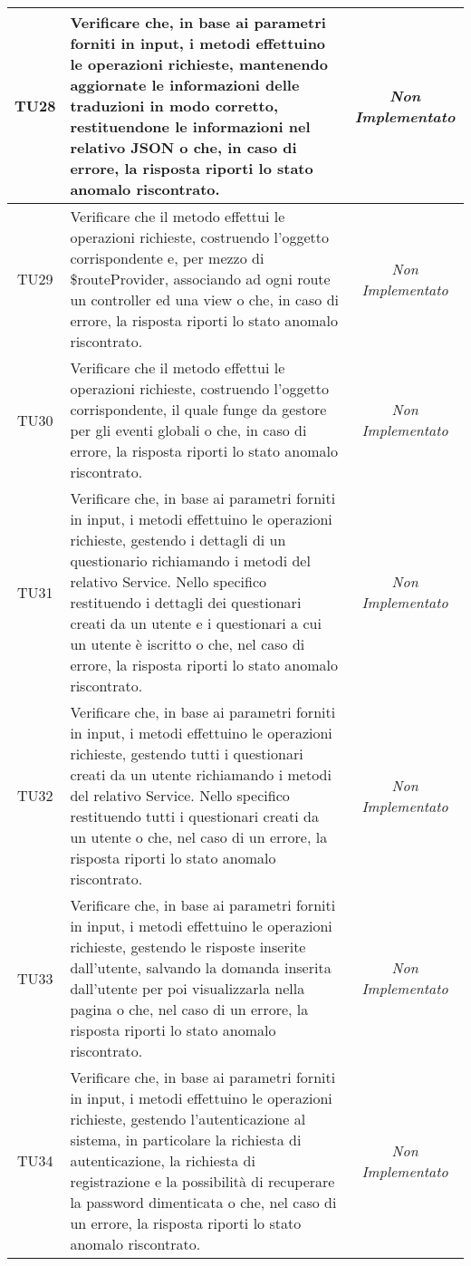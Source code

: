 \begin{longtable}{|c|>{}m{10cm}|c|}
\hypertarget{TU28}{TU28} & Verificare che, in base ai parametri forniti in input, i metodi effettuino le operazioni richieste, mantenendo aggiornate le informazioni delle traduzioni in modo corretto, restituendone le informazioni nel relativo JSON o che, in caso di errore, la risposta riporti lo stato anomalo riscontrato. & \textit{Non Implementato}\\ \hline
\hypertarget{TU29}{TU29} & Verificare che il metodo effettui le operazioni richieste, costruendo l’oggetto corrispondente e, per mezzo
di \$routeProvider, associando ad ogni route un controller ed una view o che, in caso di errore, la
risposta riporti lo stato anomalo riscontrato. & \textit{Non Implementato}\\ \hline
\hypertarget{TU30}{TU30} & Verificare che il metodo effettui le operazioni richieste, costruendo l’oggetto corrispondente, il quale funge da gestore per gli eventi globali o che, in caso di
errore, la risposta riporti lo stato anomalo riscontrato. & \textit{Non Implementato}\\ \hline
\hypertarget{TU31}{TU31} & Verificare che, in base ai parametri forniti in input, i metodi effettuino le operazioni richieste, gestendo i dettagli di un questionario richiamando i metodi del relativo Service. Nello specifico restituendo i dettagli dei questionari creati da un utente e i questionari a cui un utente è iscritto o che, nel caso di errore, la risposta riporti lo stato anomalo riscontrato. & \textit{Non Implementato}\\ \hline
\hypertarget{TU32}{TU32} & Verificare che, in base ai parametri forniti in input, i metodi effettuino le operazioni richieste, gestendo tutti i questionari creati da un utente richiamando i metodi del relativo Service. Nello specifico restituendo tutti i questionari creati da un utente o che, nel caso di un errore, la risposta riporti lo stato anomalo riscontrato.  & \textit{Non Implementato}\\ \hline
\hypertarget{TU33}{TU33} & Verificare che, in base ai parametri forniti in input, i metodi effettuino le operazioni richieste, gestendo le risposte inserite dall'utente, salvando la domanda inserita dall'utente per poi visualizzarla nella pagina o che, nel caso di un errore, la risposta riporti lo stato anomalo riscontrato. & \textit{Non Implementato}\\ \hline
\hypertarget{TU34}{TU34} & Verificare che, in base ai parametri forniti in input, i metodi effettuino le operazioni richieste, gestendo l'autenticazione al sistema, in particolare la richiesta di autenticazione, la richiesta di registrazione e la possibilità di recuperare la password dimenticata o che, nel caso di un errore, la risposta riporti lo stato anomalo riscontrato. & \textit{Non Implementato}\\ \hline

\end{longtable}
